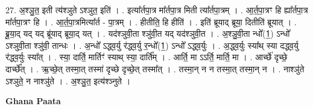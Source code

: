 \documentclass[17pt]{extarticle}
\begin{document}
27. अ॒श्ञु॒त॒ इती त्य॑श्ञुते ऽश्ञुत॒ इति॑ । . इत्या᳚र्तपा॒त्र मा᳚र्तपा॒त्र मिती त्या᳚र्तपा॒त्रम् । . आ॒र्त॒पा॒त्रꣳ हि ह्या᳚र्तपा॒त्र मा᳚र्तपा॒त्रꣳ हि । . आ॒र्त॒पा॒त्रमित्या᳚र्त - पा॒त्रम् । . हीतीति॒ हि हीति॑ । . इति॑ ब्रूयाद् ब्रूया॒ दितीति॑ ब्रूयात् । . ब्रू॒या॒द् यद् यद् ब्रू॑याद् ब्रूया॒द् यत् । . यद॑श्ञुवी॒ता श्ञु॑वी॒त यद् यद॑श्ञुवी॒त । . अ॒श्ञु॒वी॒ता न्धो᳚(1॒) ऽन्धो᳚ ऽश्ञुवी॒ता श्ञु॑वी॒ तान्धः । . अ॒न्धो᳚ ऽद्ध्व॒र्यु र॑द्ध्व॒र्यु र॒न्धो᳚(1॒) ऽन्धो᳚ ऽद्ध्व॒र्युः । . अ॒द्ध्व॒र्युः स्या᳚थ् स्या दद्ध्व॒र्यु र॑द्ध्व॒र्युः स्या᳚त् । . स्या॒ दार्ति॒ मार्तिꣳ॑ स्याथ् स्या॒ दार्ति᳚म् । . आर्ति॒ मा ऽऽर्ति॒ मार्ति॒ मा । . आर्च्छे॑ दृच्छे॒ दार्च्छे᳚त् । . ऋ॒च्छे॒त् तस्मा॒त् तस्मा॑ दृच्छे दृच्छे॒त् तस्मा᳚त् । . तस्मा॒न् न न तस्मा॒त् तस्मा॒न् न । . नाश्ञु॑ते ऽश्ञुते॒ न नाश्ञु॑ते । . अ॒श्ञु॒त॒ इत्य॑श्ञ्नुते । \newline

\textbf{Ghana Paata } \newline
\end{document}
